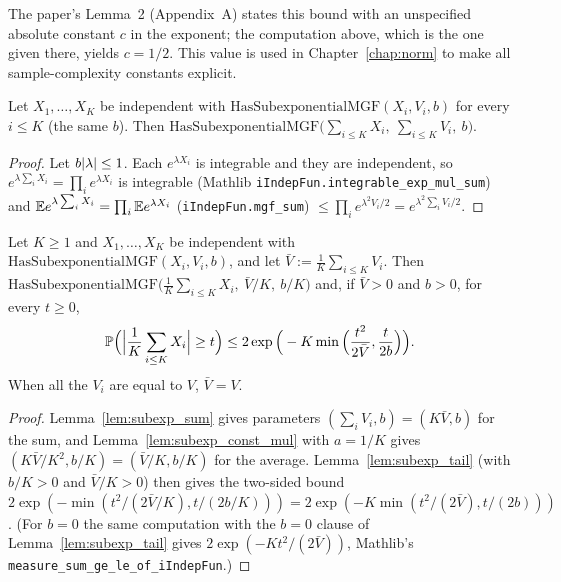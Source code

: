 \begin{remark}\label{rem:ps_tail_constant}
The paper's Lemma~2 (Appendix~A) states this bound with an unspecified absolute constant $c$
in the exponent; the computation above, which is the one given there, yields $c = 1/2$. This
value is used in Chapter~\ref{chap:norm} to make all sample-complexity constants explicit.
\end{remark}

\begin{lemma}\label{lem:subexp_sum}
\leanok
{}
Let $X_1,\dots,X_K$ be independent with $\mathrm{HasSubexponentialMGF}(X_i,V_i,b)$ for every
$i \le K$ (the same $b$). Then $\mathrm{HasSubexponentialMGF}\big(\sum_{i\le K}X_i,\ \sum_{i\le K}V_i,\ b\big)$.
\end{lemma}

\begin{proof}
\leanok
{}
Let $b\lvert \lambda \rvert \le 1$. Each $e^{\lambda X_i}$ is integrable and they are independent, so
$e^{\lambda\sum_iX_i} = \prod_ie^{\lambda X_i}$ is integrable (Mathlib
\texttt{iIndepFun.integrable\_exp\_mul\_sum}) and
$\mathbb{E} e^{\lambda\sum_iX_i} = \prod_i\mathbb{E} e^{\lambda X_i}$ (\texttt{iIndepFun.mgf\_sum})
$\le \prod_ie^{\lambda^2V_i/2} = e^{\lambda^2\sum_iV_i/2}$.
\end{proof}

\begin{corollary}\label{cor:subexp_average_tail}
\leanok
{}
Let $K \ge 1$ and $X_1,\dots,X_K$ be independent with $\mathrm{HasSubexponentialMGF}(X_i,V_i,b)$,
and let $\bar V := \frac1K\sum_{i\le K}V_i$. Then
$\mathrm{HasSubexponentialMGF}\big(\frac1K\sum_{i\le K}X_i,\ \bar V/K,\ b/K\big)$ and, if
$\bar V > 0$ and $b > 0$, for every $t \ge 0$,
\[
  \mathbb{P}\Big(\Big|\frac1K\sum_{i\le K}X_i\Big| \ge t\Big)
  \le 2\exp\Big(-K\min\Big(\frac{t^2}{2\bar V}, \frac{t}{2b}\Big)\Big).
\]
When all the $V_i$ are equal to $V$, $\bar V = V$.
\end{corollary}

\begin{proof}
\leanok
{}
Lemma~\ref{lem:subexp_sum} gives parameters $(\sum_iV_i, b) = (K\bar V, b)$ for the sum, and
Lemma~\ref{lem:subexp_const_mul} with $a = 1/K$ gives $(K\bar V/K^2, b/K) = (\bar V/K, b/K)$ for
the average. Lemma~\ref{lem:subexp_tail} (with $b/K > 0$ and $\bar V/K > 0$) then gives the
two-sided bound
$2\exp(-\min(t^2/(2\bar V/K), t/(2b/K))) = 2\exp(-K\min(t^2/(2\bar V), t/(2b)))$.
(For $b = 0$ the same computation with the $b = 0$ clause of Lemma~\ref{lem:subexp_tail} gives
$2\exp(-Kt^2/(2\bar V))$, Mathlib's \texttt{measure\_sum\_ge\_le\_of\_iIndepFun}.)
\end{proof}

